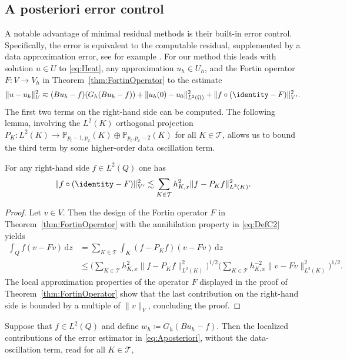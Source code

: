 \documentclass{amsart}
\providecommand{\tria}{\mathcal{T}}
\providecommand{\dz}{\,\mathrm{d}z}
\begin{document}
\subsection{A posteriori error control}\label{subsec:Aposteriori}
A notable advantage of minimal residual methods is their built-in error control. Specifically, the error is equivalent to the computable residual, supplemented by a data approximation error, see for example \cite[Sec.~3.4]{MonsuurStevensonStorn23}. For our method this leads with solution $u\in U$ to \eqref{eq:Heat}, any approximation $u_h \in U_h$, and the Fortin operator $F \colon V \to V_h$ in Theorem~\ref{thm:FortinOperator} to the estimate
\begin{equation}\label{eq:Aposteriori}
\lVert u - u_h \rVert_U^2 \eqsim (Bu_h-f) (G_h(Bu_h-f)) + \lVert u_h(0) - u_0\rVert^2_{L^2(\Omega)} + \lVert f \circ (\identity - F)\rVert^2_{V'}.
\end{equation} 
%
The first two terms on the right-hand side can be computed.
The following lemma, involving the $L^2(K)$ orthogonal projection $P_K\colon L^2(K) \to \mathbb{P}_{p_t-1,p_x}(K) \oplus \mathbb{P}_{p_t,p_x-2}(K)$ for all $K\in \tria$, allows us to bound the third term by some higher-order data oscillation term.
\begin{lemma}
For any right-hand side $f\in L^2(Q)$ one has
\begin{equation*}
\lVert f \circ (\identity - F)\rVert^2_{V'} \lesssim \sum_{K\in \tria} h_{K,x}^2 \lVert f - P_K f\rVert_{L^2(K)}^2.
\end{equation*}
\end{lemma}
\begin{proof}
Let $v\in V$. Then the design of the Fortin operator $F$ in Theorem~\ref{thm:FortinOperator} with the annihilation property in \eqref{eq:DefC2} yields
\begin{align*}
\int_Q f (v-F v) \dz &= \sum_{K\in \tria} \int_K (f-P_K f) (v-F v) \dz \\
&\leq  \Big(\sum_{K\in \tria} h_{K,x}^2 \lVert f - P_K f\rVert_{L^2(K)}^2 \Big)^{1/2} \Big(\sum_{K\in \tria} h_{K,x}^{-2} \lVert v - F v \rVert_{L^2(K)}^2 \Big)^{1/2}.
\end{align*}
The local approximation properties of the operator $F$ displayed in the proof of Theorem~\ref{thm:FortinOperator} show that the last contribution on the right-hand side is bounded by a multiple of $\lVert v \rVert_V$, concluding the proof.
\end{proof}
Suppose that $f\in L^2(Q)$ and define $w_h \coloneqq G_h(Bu_h-f)$. Then the localized contributions of the error estimator in \eqref{eq:Aposteriori}, without the data-oscillation term, read for all $K\in \tria$,
\end{document}
